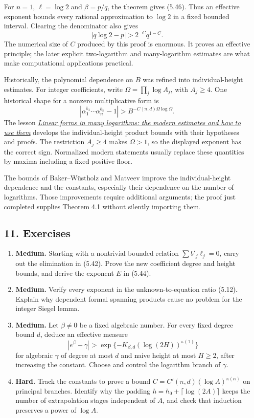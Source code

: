 \documentclass[
  11pt,
  a4paper,
]{article}
\providecommand{\tightlist}{%
  \setlength{\itemsep}{0pt}\setlength{\parskip}{0pt}}
\begin{document}
For \(n=1\), \(\ell=\log2\) and \(\beta=p/q\), the theorem gives (5.46).
Thus an effective exponent bounds every rational approximation to
\(\log2\) in a fixed bounded interval. Clearing the denominator also
gives \[
|q\log2-p|>2^{-C}q^{1-C}.
\] The numerical size of \(C\) produced by this proof is enormous. It
proves an effective principle; the later explicit two-logarithm and
many-logarithm estimates are what make computational applications
practical.

Historically, the polynomial dependence on \(B\) was refined into
individual-height estimates. For integer coefficients, write
\(\Omega=\prod_j\log A_j\), with \(A_j\ge4\). One historical shape for a
nonzero multiplicative form is \[
|\alpha_1^{b_1}\cdots\alpha_n^{b_n}-1|
>B^{-C(n,d)\Omega\log\Omega}.
\] The lesson \href{https://kokunoyumeto.github.io/open-math-courses-public/courses/TR-BAKER/TR-BAKER-08.html}{\emph{Linear forms in many
logarithms: the modern estimates and how to use them}} develops the
individual-height product bounds with their hypotheses and proofs. The
restriction \(A_j\ge4\) makes \(\Omega>1\), so the displayed exponent
has the correct sign. Normalized modern statements usually replace these
quantities by maxima including a fixed positive floor.

The bounds of Baker--Wüstholz and Matveev improve the individual-height
dependence and the constants, especially their dependence on the number
of logarithms. Those improvements require additional arguments; the
proof just completed supplies Theorem 4.1 without silently importing
them.

\subsection{11. Exercises}\label{exercises}

\begin{enumerate}
\def\labelenumi{\arabic{enumi}.}
\tightlist
\item
  \textbf{Medium.} Starting with a nontrivial bounded relation
  \(\sum b'_j\ell_j=0\), carry out the elimination in (5.42). Prove the
  new coefficient degree and height bounds, and derive the exponent
  \(E\) in (5.44).
\item
  \textbf{Medium.} Verify every exponent in the unknown-to-equation
  ratio (5.12). Explain why dependent formal spanning products cause no
  problem for the integer Siegel lemma.
\item
  \textbf{Medium.} Let \(\beta\ne0\) be a fixed algebraic number. For
  every fixed degree bound \(d\), deduce an effective measure \[
  |e^\beta-\gamma|>\exp\{-K_{\beta,d}(\log(2H))^{\kappa(1)}\}
  \] for algebraic \(\gamma\) of degree at most \(d\) and naive height
  at most \(H\ge2\), after increasing the constant. Choose and control
  the logarithm branch of \(\gamma\).
\item
  \textbf{Hard.} Track the constants to prove a bound
  \(C=C'(n,d)(\log A)^{\kappa(n)}\) on principal branches. Identify why
  the padding \(h=h_0+\lceil\log(2A)\rceil\) keeps the number of
  extrapolation stages independent of \(A\), and check that induction
  preserves a power of \(\log A\).
\end{enumerate}
\end{document}
